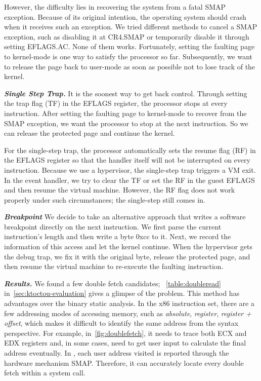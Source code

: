 However, the difficulty lies in recovering the system from a fatal SMAP exception.  Because of its original intention, the operating system should crash when it receives such an exception. We tried different methods to cancel a SMAP exception, such as disabling it at CR4.SMAP or temporarily disable it through setting EFLAGS.AC. None of them works.  Fortunately, setting the faulting page to kernel-mode is one way to satisfy the processor so far. Subsequently, we want to release the page back to user-mode as soon as possible not to lose track of the kernel.



\textbf{\textit{Single Step Trap.}} It is the soonest way to get back control. Through setting the trap flag (TF) in the EFLAGS register, the processor stops at every instruction. After setting the faulting page to kernel-mode to recover from the SMAP exception, we want the processor to stop at the next instruction. So we can release the protected page and continue the kernel.

 For the single-step trap, the processor automatically sets the resume flag (RF) in the EFLAGS register so that the handler itself will not be interrupted on every instruction. Because we use a hypervisor, the single-step trap triggers a VM exit. In the event handler, we try to clear the TF or set the RF in the guest EFLAGS and then resume the virtual machine. However, the RF flag does not work properly under such circumstances; the single-step still comes in.

 \textbf{\textit{Breakpoint}} We decide to take an alternative approach that writes a software breakpoint directly on the next instruction. We first parse the current instruction's length and then write a byte 0xcc to it. Next, we record the information of this access and let the kernel continue. When the hypervisor gets the debug trap, we fix it with the original byte, release the protected page, and then resume the virtual machine to re-execute the faulting instruction.



\textbf{\textit{Results.}} We found a few double fetch candidates; ~\autoref{table:doubleread} in~\autoref{sec:ktoctou-evaluation} gives a glimpse of the problem. This method has advantages over the binary static analysis. In the x86 instruction set, there are a few addressing modes of accessing memory, such as \textit{absolute}, \textit{register}, \textit{register + offset}, which makes it difficult to identify the same address from the syntax perspective.  For example, in~\autoref{fig:doublefetch}, it needs to trace both ECX and EDX registers and, in some cases, need to get user input to calculate the final address eventually. In \toolname, each user address visited is reported through the hardware mechanism SMAP. Therefore, it can accurately locate every double fetch within a system call.


